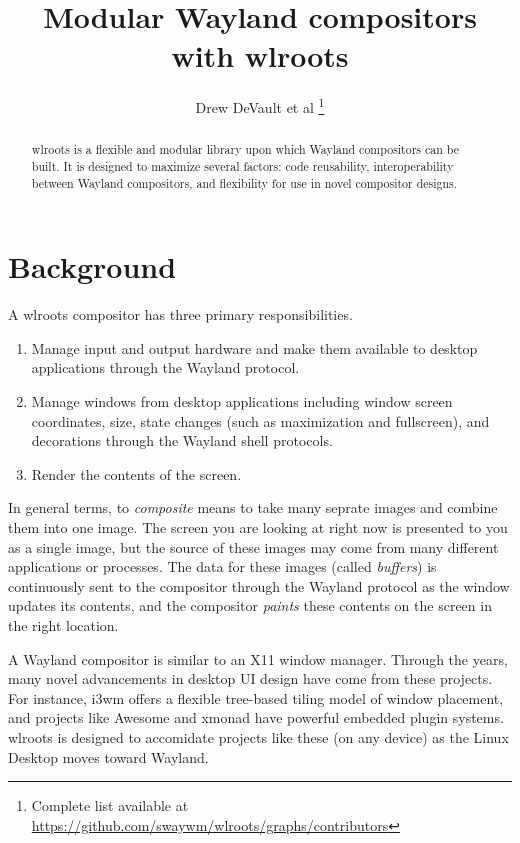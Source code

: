 \documentclass{article}
\begin{document}
\title{Modular Wayland compositors with wlroots}
\author{Drew DeVault et al
    \thanks{Complete list available at \url{https://github.com/swaywm/wlroots/graphs/contributors}}}
\maketitle

\begin{abstract}
wlroots is a flexible and modular library upon which Wayland compositors can be
built. It is designed to maximize several factors: code reusability,
interoperability between Wayland compositors, and flexibility for use in novel
compositor designs.
\end{abstract}

\newpage
\tableofcontents

\newpage
\section{Background}\label{background}

A wlroots compositor has three primary responsibilities.

\begin{enumerate}
	\item Manage input and output hardware and make them available to desktop
		applications through the Wayland protocol.
	\item Manage windows from desktop applications including window screen
		coordinates, size, state changes (such as maximization and fullscreen),
		and decorations through the Wayland shell protocols.
    \item Render the contents of the screen.
\end{enumerate}

In general terms, to \emph{composite} means to take many seprate images and
combine them into one image. The screen you are looking at right now is
presented to you as a single image, but the source of these images may come from
many different applications or processes. The data for these images (called
\emph{buffers}) is continuously sent to the compositor through the Wayland
protocol as the window updates its contents, and the compositor \emph{paints}
these contents on the screen in the right location.

A Wayland compositor is similar to an X11 window manager. Through the years,
many novel advancements in desktop UI design have come from these projects. For
instance, i3wm offers a flexible tree-based tiling model of window placement,
and projects like Awesome and xmonad have powerful embedded plugin systems.
wlroots is designed to accomidate projects like these (on any device) as the
Linux Desktop moves toward Wayland.
\end{document}
